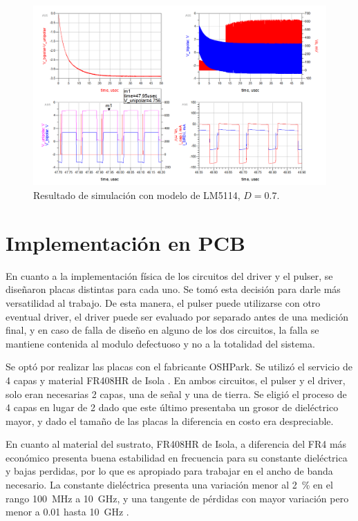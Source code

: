 \begin{figure}[tbp]
    \centering
    \includegraphics[width=\textwidth]{images/lm5114_sim_result_70_D.png}
    \caption{Resultado de simulación con modelo de LM5114, $D=0.7$.}
    \label{fig:lm5114_sim_result_70_D}
\end{figure}

\section{Implementación en PCB}

En cuanto a la implementación física de los circuitos del driver y el pulser, se
diseñaron placas distintas para cada uno. Se tomó esta decisión para darle
más versatilidad al trabajo. De esta manera, el pulser puede utilizarse con otro
eventual driver, el driver puede ser evaluado por separado antes de una medición
final, y en caso de falla de diseño en alguno de los dos circuitos, la falla se
mantiene contenida al modulo defectuoso y no a la totalidad del sistema.

Se optó por realizar las placas con el fabricante OSHPark. Se utilizó el servicio de 4
capas y material FR408HR de Isola \cite{fr408_datasheet}. En ambos circuitos, el
pulser y el driver, solo eran necesarias 2 capas, una de señal y una de tierra.
Se eligió el proceso de 4 capas en lugar de 2 dado que este último presentaba
un grosor de dieléctrico mayor, y dado el tamaño de las placas la diferencia en
costo era despreciable.

En cuanto al material del sustrato, FR408HR de Isola, a diferencia del FR4 más
económico presenta buena estabilidad en frecuencia para su constante
dieléctrica y bajas perdidas, por lo que es apropiado para trabajar en el ancho
de banda necesario. La constante dieléctrica presenta una variación menor al
\qty{2}{\percent} en el rango \qty{100}{\mega\hertz} a \qty{10}{\giga\hertz}, y
una tangente de pérdidas con mayor variación pero menor a \num{0.01} hasta
\qty{10}{\giga\hertz} \cite{fr408_datasheet}.


